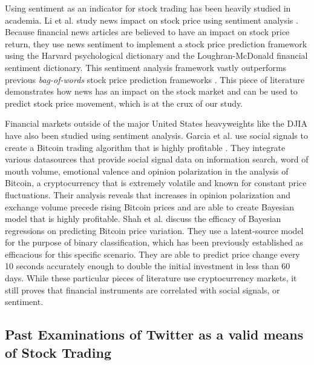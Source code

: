 \documentclass[../thesis.tex]{subfiles}
\begin{document}
Using sentiment as an indicator for stock trading has been heavily studied in academia. Li et al. study news impact on stock price using sentiment analysis \cite{Li2014}. Because financial news articles are believed to have an impact on stock price return, they use news sentiment to implement a stock price prediction framework using the Harvard psychological dictionary and the Loughran-McDonald financial sentiment dictionary. This sentiment analysis framework vastly outperforms previous \textit{bag-of-words} stock price prediction frameworks  \cite{Li2014}. This piece of literature demonstrates how news has an impact on the stock market and can be used to predict stock price movement, which is at the crux of our study. 

Financial markets outside of the major United States heavyweights like the DJIA have also been studied using sentiment analysis. Garcia et al. use social signals to create a Bitcoin trading algorithm that is highly profitable \cite{Garcia2015}. They integrate various datasources that provide social signal data on information search, word of mouth volume, emotional valence and opinion polarization in the analysis of Bitcoin, a cryptocurrency that is extremely volatile and known for constant price fluctuations. Their analysis reveals that increases in opinion polarization and exchange volume precede rising Bitcoin prices and are able to create Bayesian model that is highly profitable. Shah et al. \cite{Shah2014} discuss the efficacy of Bayesian regressions on predicting Bitcoin price variation. They use a latent-source model for the purpose of binary classification, which has been previously established as efficacious for this specific scenario. They are able to predict price change every 10 seconds accurately enough to double the initial investment in less than 60 days. While these particular pieces of literature use cryptocurrency markets, it still proves that financial instruments are correlated with social signals, or sentiment.  

\subsection{Past Examinations of Twitter as a valid means of Stock Trading}
\end{document}
